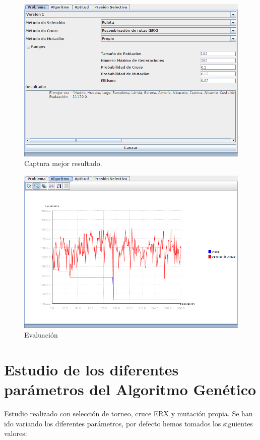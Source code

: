 \documentclass[12pt]{article}
\begin{document}
\begin{figure}[H]
\centering
\includegraphics[scale=0.4]{graficas/fig3}
\caption{Captura mejor resultado.}
\end{figure}

\begin{figure}[H]
\centering
\includegraphics[scale=0.4]{graficas/fig3graf}
\caption{Evaluación}
\end{figure} 

\section{Estudio de los diferentes parámetros del Algoritmo Genético}

	Estudio realizado con selección de torneo, cruce ERX y mutación propia. Se han ido variando los diferentes parámetros, por defecto hemos tomados los siguientes valores:
\end{document}
